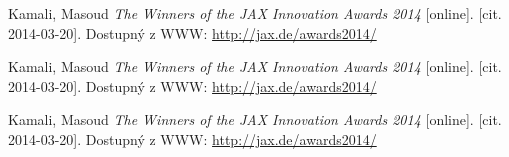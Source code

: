 \begin{thebibliography}{10}




Kamali, Masoud \emph{The Winners of the JAX Innovation Awards 2014}
{[}online]. {[}cit. 2014-03-20]. Dostupný z WWW: \url{http://jax.de/awards2014/}

Kamali, Masoud \emph{The Winners of the JAX Innovation Awards 2014}
{[}online]. {[}cit. 2014-03-20]. Dostupný z WWW: \url{http://jax.de/awards2014/}

Kamali, Masoud \emph{The Winners of the JAX Innovation Awards 2014}
{[}online]. {[}cit. 2014-03-20]. Dostupný z WWW: \url{http://jax.de/awards2014/}

\end{thebibliography}